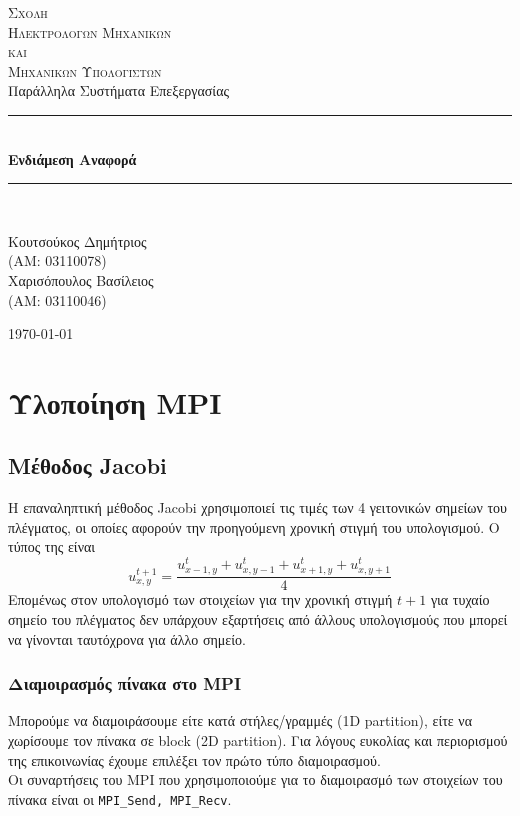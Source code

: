 \documentclass[11pt,a4paper]{article}
\newcommand{\HRule}{\rule{\linewidth}{0.5mm}}
\begin{document}
\begin{titlepage}
\centering


\textsc{\LARGE Σχολη \\ Ηλεκτρολογων Μηχανικων \\[-3pt] και \\[6pt] Μηχανικων Υπολογιστων}\\[1.5cm]
{\Large Παράλληλα Συστήματα Επεξεργασίας}\\[0.5cm]

\HRule \\[0.5cm]
{\huge \bfseries Ενδιάμεση Αναφορά}\\[0.2cm]
\HRule \\[1.5cm]

\begin{minipage}{0.4\textwidth}
\large
Κουτσούκος Δημήτριος \\
(ΑΜ: 03110078) \\
Χαρισόπουλος Βασίλειος \\
(ΑΜ: 03110046)
\end{minipage}

\vfill

{\large \today}
\end{titlepage}

\clearpage
\clearpage
\newpage
\section{Υλοποίηση MPI}
\subsection{Μέθοδος Jacobi}
Η επαναληπτική μέθοδος Jacobi χρησιμοποιεί τις τιμές των 4 γειτονικών σημείων του πλέγματος, οι οποίες αφορούν την προηγούμενη χρονική στιγμή του υπολογισμού. Ο τύπος της είναι
\[ u_{x,y}^{t+1} = \frac{u_{x-1,y}^t + u_{x,y-1}^t + u_{x+1, y}^t + u_{x, y+1}^t}{4} \]
Επομένως στον υπολογισμό των στοιχείων για την χρονική στιγμή $t+1$ για τυχαίο σημείο του πλέγματος δεν υπάρχουν εξαρτήσεις από άλλους υπολογισμούς που μπορεί να γίνονται ταυτόχρονα για άλλο σημείο.
\subsubsection{Διαμοιρασμός πίνακα στο MPI}
Μπορούμε να διαμοιράσουμε είτε κατά στήλες/γραμμές (1D partition), είτε να χωρίσουμε τον πίνακα σε block (2D partition). 
Για λόγους ευκολίας και περιορισμού της επικοινωνίας έχουμε επιλέξει τον πρώτο τύπο διαμοιρασμού. \\
Οι συναρτήσεις του MPI που χρησιμοποιούμε για το διαμοιρασμό των στοιχείων του πίνακα είναι οι \texttt{MPI\_Send, MPI\_Recv}.
\end{document}
